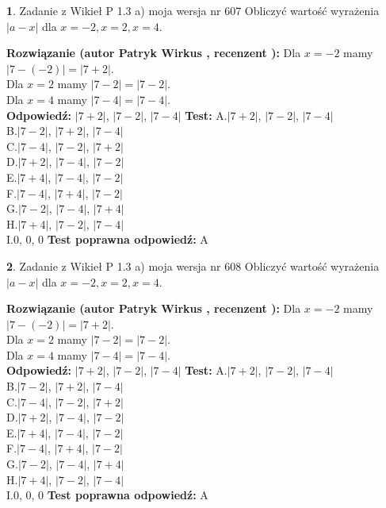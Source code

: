 \documentclass[12pt, a4paper]{article}
\theoremstyle{definition} %
\newtheorem{zad}{}
\newcommand{\zadStart}[1]{\begin{zad}#1\newline}
\newcommand{\zadStop}{\end{zad}}
\newcommand{\rozwStart}[2]{\noindent \textbf{Rozwiązanie (autor #1 , recenzent #2): }\newline}
\newcommand{\rozwStop}{\newline}
\newcommand{\odpStart}{\noindent \textbf{Odpowiedź:}\newline}
\newcommand{\odpStop}{\newline}
\newcommand{\testStart}{\noindent \textbf{Test:}\newline}
\newcommand{\testStop}{\newline}
\newcommand{\kluczStart}{\noindent \textbf{Test poprawna odpowiedź:}\newline}
\newcommand{\kluczStop}{\newline}
\begin{document}
\zadStart{Zadanie z Wikieł P 1.3 a) moja wersja nr 607}
Obliczyć wartość wyrażenia $|a - x|$ dla $x=-2,x=2,x=4$.
\zadStop
\rozwStart{Patryk Wirkus}{}
Dla $x = -2$ mamy $|7 - (-2)| = |7 + 2|$.\\
Dla $x = 2$ mamy $|7 - 2| = |7 - 2|$.\\
Dla $x = 4$ mamy $|7 - 4| = |7 - 4|$.\\
\rozwStop
\odpStart
$|7 + 2|$, $|7 - 2|$, $|7 - 4|$
\odpStop
\testStart
A.$|7 + 2|$, $|7 - 2|$, $|7 - 4|$\\
B.$|7 - 2|$, $|7 + 2|$, $|7 - 4|$\\
C.$|7 - 4|$, $|7 - 2|$, $|7 + 2|$\\
D.$|7 + 2|$, $|7 - 4|$, $|7 - 2|$\\
E.$|7 + 4|$, $|7 - 4|$, $|7 - 2|$\\
F.$|7 - 4|$, $|7 + 4|$, $|7 - 2|$\\
G.$|7 - 2|$, $|7 - 4|$, $|7 + 4|$\\
H.$|7 + 4|$, $|7 - 2|$, $|7 - 4|$\\
I.$0$, $0$, $0$
\testStop
\kluczStart
A
\kluczStop



\zadStart{Zadanie z Wikieł P 1.3 a) moja wersja nr 608}
Obliczyć wartość wyrażenia $|a - x|$ dla $x=-2,x=2,x=4$.
\zadStop
\rozwStart{Patryk Wirkus}{}
Dla $x = -2$ mamy $|7 - (-2)| = |7 + 2|$.\\
Dla $x = 2$ mamy $|7 - 2| = |7 - 2|$.\\
Dla $x = 4$ mamy $|7 - 4| = |7 - 4|$.\\
\rozwStop
\odpStart
$|7 + 2|$, $|7 - 2|$, $|7 - 4|$
\odpStop
\testStart
A.$|7 + 2|$, $|7 - 2|$, $|7 - 4|$\\
B.$|7 - 2|$, $|7 + 2|$, $|7 - 4|$\\
C.$|7 - 4|$, $|7 - 2|$, $|7 + 2|$\\
D.$|7 + 2|$, $|7 - 4|$, $|7 - 2|$\\
E.$|7 + 4|$, $|7 - 4|$, $|7 - 2|$\\
F.$|7 - 4|$, $|7 + 4|$, $|7 - 2|$\\
G.$|7 - 2|$, $|7 - 4|$, $|7 + 4|$\\
H.$|7 + 4|$, $|7 - 2|$, $|7 - 4|$\\
I.$0$, $0$, $0$
\testStop
\kluczStart
A
\kluczStop
\end{document}
